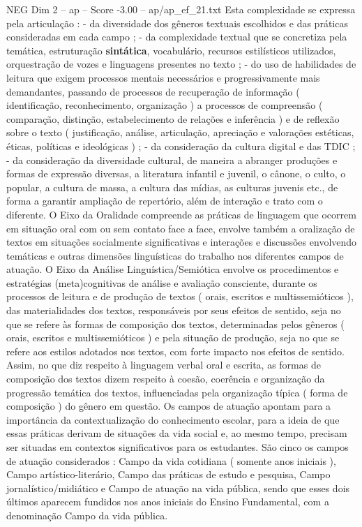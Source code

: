 \begin{textsample}{NEG Dim 2 – ap – Score -3.00 – ap/ap\_ef\_21.txt}
Esta complexidade se expressa pela articulação : - da diversidade dos gêneros textuais escolhidos e das práticas consideradas em cada campo ; - da complexidade textual que se concretiza pela temática, estruturação \textbf{sintática}, vocabulário, recursos estilísticos utilizados, orquestração de vozes e linguagens presentes no texto ; - do uso de habilidades de leitura que exigem processos mentais necessários e progressivamente mais demandantes, passando de processos de recuperação de informação ( identificação, reconhecimento, organização ) a processos de compreensão ( comparação, distinção, estabelecimento de relações e inferência ) e de reflexão sobre o texto ( justificação, análise, articulação, apreciação e valorações estéticas, éticas, políticas e ideológicas ) ; - da consideração da cultura digital e das TDIC ; - da consideração da diversidade cultural, de maneira a abranger produções e formas de expressão diversas, a literatura infantil e juvenil, o cânone, o culto, o popular, a cultura de massa, a cultura das mídias, as culturas juvenis etc., de forma a garantir ampliação de repertório, além de interação e trato com o diferente.
O Eixo da Oralidade compreende as práticas de linguagem que ocorrem em situação oral com ou sem contato face a face, envolve também a oralização de textos em situações socialmente significativas e interações e discussões envolvendo temáticas e outras dimensões linguísticas do trabalho nos diferentes campos de atuação.
O Eixo da Análise Linguística/Semiótica envolve os procedimentos e estratégias (meta)cognitivas de análise e avaliação consciente, durante os processos de leitura e de produção de textos ( orais, escritos e multissemióticos ), das materialidades dos textos, responsáveis por seus efeitos de sentido, seja no que se refere às formas de composição dos textos, determinadas pelos gêneros ( orais, escritos e multissemióticos ) e pela situação de produção, seja no que se refere aos estilos adotados nos textos, com forte impacto nos efeitos de sentido.
Assim, no que diz respeito à linguagem verbal oral e escrita, as formas de composição dos textos dizem respeito à coesão, coerência e organização da progressão temática dos textos, influenciadas pela organização típica ( forma de composição ) do gênero em questão.
Os campos de atuação apontam para a importância da contextualização do conhecimento escolar, para a ideia de que essas práticas derivam de situações da vida social e, ao mesmo tempo, precisam ser situadas em contextos significativos para os estudantes.
São cinco os campos de atuação considerados : Campo da vida cotidiana ( somente anos iniciais ), Campo artístico-literário, Campo das práticas de estudo e pesquisa, Campo jornalístico/midiático e Campo de atuação na vida pública, sendo que esses dois últimos aparecem fundidos nos anos iniciais do Ensino Fundamental, com a denominação Campo da vida pública.

\end{textsample}
